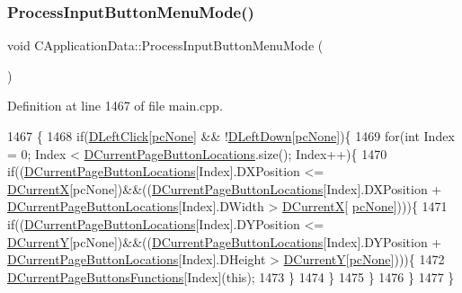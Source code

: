 \subsubsection{\texorpdfstring{Process\+Input\+Button\+Menu\+Mode()}{ProcessInputButtonMenuMode()}}
{\footnotesize\ttfamily void C\+Application\+Data\+::\+Process\+Input\+Button\+Menu\+Mode (\begin{DoxyParamCaption}{ }\end{DoxyParamCaption})\hspace{0.3cm}{\ttfamily [protected]}}



Definition at line 1467 of file main.\+cpp.


\begin{DoxyCode}
1467                                                  \{
1468     \textcolor{keywordflow}{if}(\hyperlink{classCApplicationData_a8a86bb4c7cba7b119121401dda4ca68b}{DLeftClick}[\hyperlink{GameDataTypes_8h_aafb0ca75933357ff28a6d7efbdd7602fa88767aa8e02c7b3192bbab4127b3d729}{pcNone}] && !\hyperlink{classCApplicationData_a2b943f18557c3e4c8cd4550e22e028b6}{DLeftDown}[\hyperlink{GameDataTypes_8h_aafb0ca75933357ff28a6d7efbdd7602fa88767aa8e02c7b3192bbab4127b3d729}{pcNone}])\{
1469         \textcolor{keywordflow}{for}(\textcolor{keywordtype}{int} Index = 0; Index < \hyperlink{classCApplicationData_a3615df8e23cea3ce17f11cf61340a7b4}{DCurrentPageButtonLocations}.size(); Index++)\{
1470             \textcolor{keywordflow}{if}((\hyperlink{classCApplicationData_a3615df8e23cea3ce17f11cf61340a7b4}{DCurrentPageButtonLocations}[Index].DXPosition <= 
      \hyperlink{classCApplicationData_a1dc7ee482a39f7978c71365ac540f97a}{DCurrentX}[pcNone])&&((\hyperlink{classCApplicationData_a3615df8e23cea3ce17f11cf61340a7b4}{DCurrentPageButtonLocations}[Index].DXPosition + 
      \hyperlink{classCApplicationData_a3615df8e23cea3ce17f11cf61340a7b4}{DCurrentPageButtonLocations}[Index].DWidth > \hyperlink{classCApplicationData_a1dc7ee482a39f7978c71365ac540f97a}{DCurrentX}[
      \hyperlink{GameDataTypes_8h_aafb0ca75933357ff28a6d7efbdd7602fa88767aa8e02c7b3192bbab4127b3d729}{pcNone}])))\{
1471                 \textcolor{keywordflow}{if}((\hyperlink{classCApplicationData_a3615df8e23cea3ce17f11cf61340a7b4}{DCurrentPageButtonLocations}[Index].DYPosition <= 
      \hyperlink{classCApplicationData_a0ba39779ae11c8072258c6ddfebd6052}{DCurrentY}[pcNone])&&((\hyperlink{classCApplicationData_a3615df8e23cea3ce17f11cf61340a7b4}{DCurrentPageButtonLocations}[Index].DYPosition + 
      \hyperlink{classCApplicationData_a3615df8e23cea3ce17f11cf61340a7b4}{DCurrentPageButtonLocations}[Index].DHeight > 
      \hyperlink{classCApplicationData_a0ba39779ae11c8072258c6ddfebd6052}{DCurrentY}[\hyperlink{GameDataTypes_8h_aafb0ca75933357ff28a6d7efbdd7602fa88767aa8e02c7b3192bbab4127b3d729}{pcNone}])))\{
1472                     \hyperlink{classCApplicationData_ad3079e5563a19d21c1e4ceff2a188382}{DCurrentPageButtonsFunctions}[Index](\textcolor{keyword}{this});
1473                 \}
1474             \}
1475         \}
1476     \}   
1477 \}
\end{DoxyCode}
